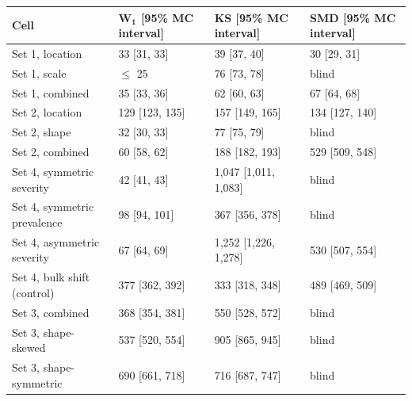 {\footnotesize
\begin{tabular}{llll}
\toprule
\textbf{Cell} & $\boldsymbol{W_1}$ \textbf{[95\% MC interval]} & \textbf{KS [95\% MC interval]} & \textbf{SMD [95\% MC interval]} \\
\midrule
Set 1, location & 33 [31, 33] & 39 [37, 40] & 30 [29, 31] \\
Set 1, scale & $\leq$ 25 & 76 [73, 78] & blind \\
Set 1, combined & 35 [33, 36] & 62 [60, 63] & 67 [64, 68] \\
Set 2, location & 129 [123, 135] & 157 [149, 165] & 134 [127, 140] \\
Set 2, shape & 32 [30, 33] & 77 [75, 79] & blind \\
Set 2, combined & 60 [58, 62] & 188 [182, 193] & 529 [509, 548] \\
Set 4, symmetric severity & 42 [41, 43] & 1{,}047 [1{,}011, 1{,}083] & blind \\
Set 4, symmetric prevalence & 98 [94, 101] & 367 [356, 378] & blind \\
Set 4, asymmetric severity & 67 [64, 69] & 1{,}252 [1{,}226, 1{,}278] & 530 [507, 554] \\
Set 4, bulk shift (control) & 377 [362, 392] & 333 [318, 348] & 489 [469, 509] \\
Set 3, combined & 368 [354, 381] & 550 [528, 572] & blind \\
Set 3, shape-skewed & 537 [520, 554] & 905 [865, 945] & blind \\
Set 3, shape-symmetric & 690 [661, 718] & 716 [687, 747] & blind \\
\bottomrule
\end{tabular}
}
